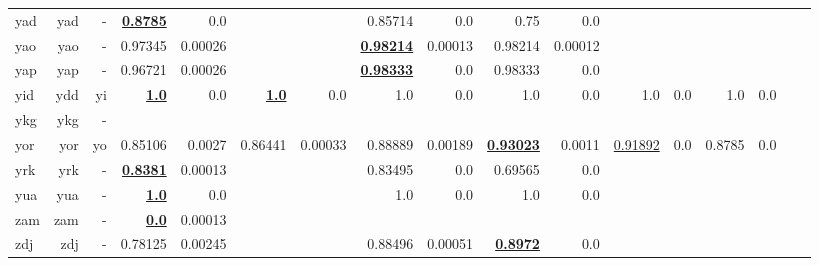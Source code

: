 \documentclass[11pt]{article}
\begin{document}
\begin{table*}[h]
{\begin{tabular}{lrrrrrrrrrrrrrrrr}
yad         & yad         & -         & \textbf{\underline{0.8785}}         & 0.0         &          &          & 0.85714         & 0.0         & 0.75         & 0.0         &          &          &          &          \\
yao         & yao         & -         & 0.97345         & 0.00026         &          &          & \textbf{\underline{0.98214}}         & 0.00013         & 0.98214         & 0.00012         &          &          &          &          \\
yap         & yap         & -         & 0.96721         & 0.00026         &          &          & \textbf{\underline{0.98333}}         & 0.0         & 0.98333         & 0.0         &          &          &          &          \\
yid         & ydd         & yi         & \textbf{\underline{1.0}}         & 0.0         & \textbf{\underline{1.0}}         & 0.0         & 1.0         & 0.0         & 1.0         & 0.0         & 1.0         & 0.0         & 1.0         & 0.0         \\
ykg         & ykg         & -         &          &          &          &          &          &          &          &          &          &          &          &          \\
yor         & yor         & yo         & 0.85106         & 0.0027         & 0.86441         & 0.00033         & 0.88889         & 0.00189         & \textbf{\underline{0.93023}}         & 0.0011         & \underline{0.91892}         & 0.0         & 0.8785         & 0.0         \\
yrk         & yrk         & -         & \textbf{\underline{0.8381}}         & 0.00013         &          &          & 0.83495         & 0.0         & 0.69565         & 0.0         &          &          &          &          \\
yua         & yua         & -         & \textbf{\underline{1.0}}         & 0.0         &          &          & 1.0         & 0.0         & 1.0         & 0.0         &          &          &          &          \\
zam         & zam         & -         & \textbf{\underline{0.0}}         & 0.00013         &          &          &          &          &          &          &          &          &          &          \\
zdj         & zdj         & -         & 0.78125         & 0.00245         &          &          & 0.88496         & 0.00051         & \textbf{\underline{0.8972}}         & 0.0         &          &          &          &          \\

\end{tabular}}
\end{table*}
\end{document}
